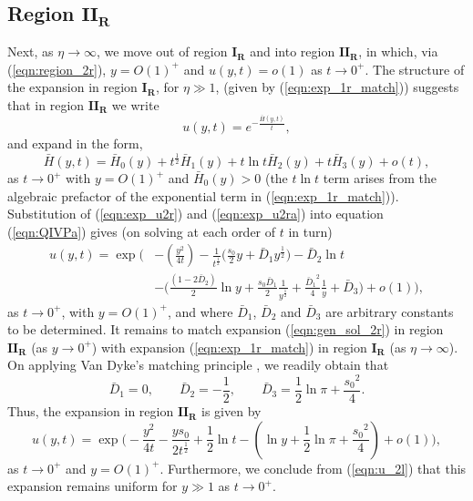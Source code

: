 \documentclass[11pt,a4paper]{article}
\newcommand{\eeref}[1]{(\ref{eqn:#1})}
\newcommand{\eelab}[1]{\label{eqn:#1}}
\def\beq{\begin{equation}}
\def\eeq{\end{equation}}
\begin{document}
\subsection{Region $\mathbf{II_R}$} 

Next, as $\eta \to \infty$, we move out of region $\mathbf{I_R}$ and into region $\mathbf{II_R}$, in which, via \eeref{region_2r},  $y=O(1)^+$ and $u(y,t)= o(1)$ as $t \to 0^+$. The structure of the expansion in region $\mathbf{I_R}$, for $\eta \gg 1$, (given by \eeref{exp_1r_match}) suggests that in region $\mathbf{II_R}$ we write 
\beq \eelab{exp_u2r}
u(y,t) = e^{-\frac{\bar{H}(y,t)}{t}},
\eeq
and expand in the form,
\beq \eelab{exp_u2ra}
\bar{H}(y,t) = \bar{H}_0(y) + t^{\frac{1}{2}} \bar{H}_1(y) + t \ln t \bar{H}_2(y) + t \bar{H}_3(y) + o(t),
\eeq
as $t \to 0^+$ with $y=O(1)^+$ and $\bar{H}_0(y) > 0$ 
 (the $t\ln t$ term arises from the algebraic prefactor of the exponential term in \eeref{exp_1r_match}).
Substitution of \eeref{exp_u2r} and \eeref{exp_u2ra} into equation \eeref{QIVPa} gives (on solving at each order of $t$ in turn)
\beq \eelab{gen_sol_2r}
\begin{split}
u(y,t) =  \exp \Bigg( & -   \left( \frac{y^2 }{4t} \right)  - \frac{1}{t^{\frac{1}{2}}} \bigg( \frac{s_0}{2} y + \bar{D}_1   y^{\frac{1}{2}} \bigg)   - \bar{D}_2 \ln t  \\
 &    - \bigg( \frac{ \left( 1-2\bar{D}_2 \right) }{2} \ln  y + \frac{s_0 \bar{D}_1}{2} \frac{1}{ y^{\frac{1}{2}}} + \frac{{\bar{D}_1}^2}{4} \frac{1}{y} + \bar{D}_3 \bigg) +o(1) 
\Bigg),
\end{split}
\eeq
as $t \to 0^+$, with $y=O(1)^+$, and where $\bar{D}_1$, $\bar{D}_2$ and $\bar{D}_3$ are arbitrary constants to be determined. It remains to match expansion \eeref{gen_sol_2r} in region $\mathbf{II_R}$ (as $y \to 0^+$) with expansion \eeref{exp_1r_match} in region $\mathbf{I_R}$ (as $\eta \to \infty$). On applying Van Dyke's matching principle \cite{VanDyke1975}, we readily obtain that 
\beq
 \bar{D}_1=0, \qquad \bar{D}_2 = - \frac{1}{2}, \qquad \bar{D}_3 =\frac{1}{2} \ln \pi + \frac{{s_0}^2}{4}.
\eeq 
Thus, the expansion in region $\mathbf{II_R}$ is given by 
\beq \eelab{u_2r}
u(y,t) = \exp \Bigg( -\frac{y^2}{4t}  - \frac{y s_0}{2 t^{\frac{1}{2}}}   + \frac{1}{2} \ln t  -  \left( \ln y + \frac{1}{2} \ln \pi  + \frac{{s_0}^2}{4}  \right) +o(1) \Bigg),
\eeq
as $t \to 0^+$ and  $y=O(1)^+$. Furthermore, we conclude from \eeref{u_2l} that this expansion remains uniform for $y \gg 1$ as $t \to 0^+$.

\bigskip
\end{document}
